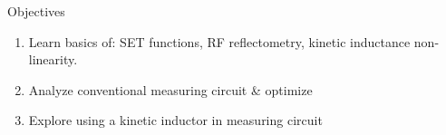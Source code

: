 \documentclass[../main.tex]{subfiles}
\begin{document}


\begin{frame}{Objectives}
\begin{enumerate}
    \item Learn basics of: SET functions, RF reflectometry,
         kinetic inductance non-linearity.
    \item Analyze conventional measuring circuit \& optimize
    \item Explore using a kinetic inductor in measuring circuit
\end{enumerate}
\end{frame}
\end{document}
